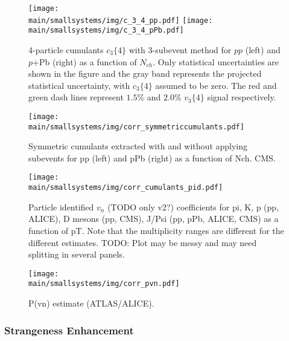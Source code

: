 \documentclass[../report.tex]{subfiles}
\providecommand{\main}{..}
\begin{document}
\begin{figure}[ht]
\centering
\texttt{[image: \\main/smallsystems/img/c\_3\_4\_pp.pdf]}
\texttt{[image: \\main/smallsystems/img/c\_3\_4\_pPb.pdf]}

\caption{4-particle cumulants $c_3\{4\}$ with 3-subevent method for $pp$ (left) and $p$+Pb (right) as a function of $N_{ch}$. Only statistical uncertainties are shown in the figure and the gray band represents the projected statistical uncertainty, with $c_3\{4\}$ assumed to be zero. The red and green dash lines represent $1.5\%$ and $2.0\%$ $v_3\{4\}$ signal respectively.}
\label{fig:smallsystems_corr_cumulants}
\end{figure}



\begin{figure}[ht]
\centering
\texttt{[image: \\main/smallsystems/img/corr\_symmetriccumulants.pdf]}
\caption{Symmetric cumulants extracted with and without applying subevents for pp (left) and pPb (right) as a function of Nch. CMS.}
\label{fig:smallsystems_corr_symmetriccumulants}
\end{figure}

\begin{figure}[ht]
\centering
\texttt{[image: \\main/smallsystems/img/corr\_cumulants\_pid.pdf]}

\caption{Particle identified $v_n$ (TODO only v2?) coefficients for pi, K, p (pp, ALICE), D mesons (pp, CMS), J/Psi (pp, pPb, ALICE, CMS) as a function of pT. Note that the multiplicity ranges are different for the different estimates. TODO: Plot may be messy and may need splitting in several panels.}
\label{fig:smallsystems_corr_cumulants_pid}
\end{figure}

\begin{figure}[ht]
\centering
\texttt{[image: \\main/smallsystems/img/corr\_pvn.pdf]}

\caption{P(vn) estimate (ATLAS/ALICE).}
\label{fig:smallsystems_corr_pvn}
\end{figure}


\subsubsection{Strangeness Enhancement}
\end{document}
